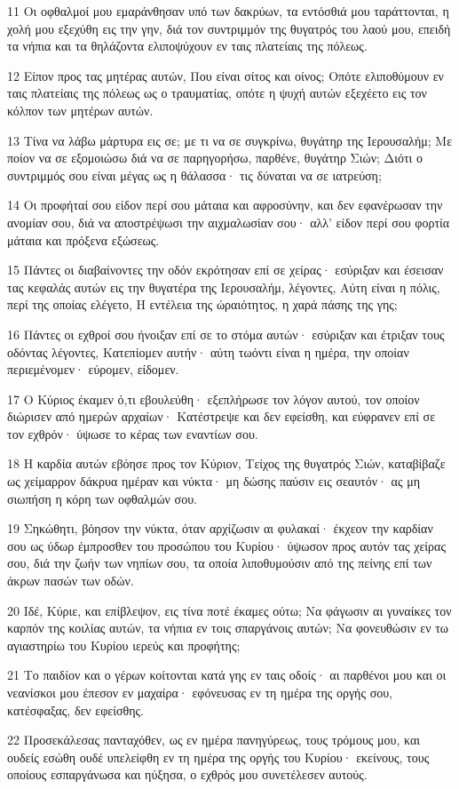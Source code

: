 \par 11 Οι οφθαλμοί μου εμαράνθησαν υπό των δακρύων, τα εντόσθιά μου ταράττονται, η χολή μου εξεχύθη εις την γην, διά τον συντριμμόν της θυγατρός του λαού μου, επειδή τα νήπια και τα θηλάζοντα ελιποψύχουν εν ταις πλατείαις της πόλεως.
\par 12 Είπον προς τας μητέρας αυτών, Που είναι σίτος και οίνος; Οπότε ελιποθύμουν εν ταις πλατείαις της πόλεως ως ο τραυματίας, οπότε η ψυχή αυτών εξεχέετο εις τον κόλπον των μητέρων αυτών.
\par 13 Τίνα να λάβω μάρτυρα εις σε; με τι να σε συγκρίνω, θυγάτηρ της Ιερουσαλήμ; Με ποίον να σε εξομοιώσω διά να σε παρηγορήσω, παρθένε, θυγάτηρ Σιών; Διότι ο συντριμμός σου είναι μέγας ως η θάλασσα· τις δύναται να σε ιατρεύση;
\par 14 Οι προφήταί σου είδον περί σου μάταια και αφροσύνην, και δεν εφανέρωσαν την ανομίαν σου, διά να αποστρέψωσι την αιχμαλωσίαν σου· αλλ' είδον περί σου φορτία μάταια και πρόξενα εξώσεως.
\par 15 Πάντες οι διαβαίνοντες την οδόν εκρότησαν επί σε χείρας· εσύριξαν και έσεισαν τας κεφαλάς αυτών εις την θυγατέρα της Ιερουσαλήμ, λέγοντες, Αύτη είναι η πόλις, περί της οποίας ελέγετο, Η εντέλεια της ώραιότητος, η χαρά πάσης της γης;
\par 16 Πάντες οι εχθροί σου ήνοιξαν επί σε το στόμα αυτών· εσύριξαν και έτριξαν τους οδόντας λέγοντες, Κατεπίομεν αυτήν· αύτη τωόντι είναι η ημέρα, την οποίαν περιεμένομεν· εύρομεν, είδομεν.
\par 17 Ο Κύριος έκαμεν ό,τι εβουλεύθη· εξεπλήρωσε τον λόγον αυτού, τον οποίον διώρισεν από ημερών αρχαίων· Κατέστρεψε και δεν εφείσθη, και εύφρανεν επί σε τον εχθρόν· ύψωσε το κέρας των εναντίων σου.
\par 18 Η καρδία αυτών εβόησε προς τον Κύριον, Τείχος της θυγατρός Σιών, καταβίβαζε ως χείμαρρον δάκρυα ημέραν και νύκτα· μη δώσης παύσιν εις σεαυτόν· ας μη σιωπήση η κόρη των οφθαλμών σου.
\par 19 Σηκώθητι, βόησον την νύκτα, όταν αρχίζωσιν αι φυλακαί· έκχεον την καρδίαν σου ως ύδωρ έμπροσθεν του προσώπου του Κυρίου· ύψωσον προς αυτόν τας χείρας σου, διά την ζωήν των νηπίων σου, τα οποία λιποθυμούσιν από της πείνης επί των άκρων πασών των οδών.
\par 20 Ιδέ, Κύριε, και επίβλεψον, εις τίνα ποτέ έκαμες ούτω; Να φάγωσιν αι γυναίκες τον καρπόν της κοιλίας αυτών, τα νήπια εν τοις σπαργάνοις αυτών; Να φονευθώσιν εν τω αγιαστηρίω του Κυρίου ιερεύς και προφήτης;
\par 21 Το παιδίον και ο γέρων κοίτονται κατά γης εν ταις οδοίς· αι παρθένοι μου και οι νεανίσκοι μου έπεσον εν μαχαίρα· εφόνευσας εν τη ημέρα της οργής σου, κατέσφαξας, δεν εφείσθης.
\par 22 Προσεκάλεσας πανταχόθεν, ως εν ημέρα πανηγύρεως, τους τρόμους μου, και ουδείς εσώθη ουδέ υπελείφθη εν τη ημέρα της οργής του Κυρίου· εκείνους, τους οποίους εσπαργάνωσα και ηύξησα, ο εχθρός μου συνετέλεσεν αυτούς.

